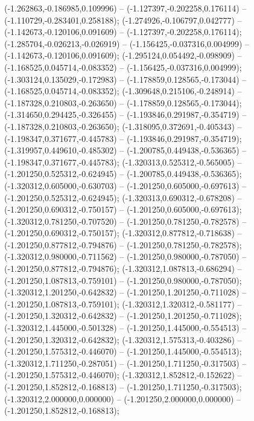  (-1.262863,-0.186985,0.109996) -- (-1.127397,-0.202258,0.176114) -- (-1.110729,-0.283401,0.258188);
 (-1.274926,-0.106797,0.042777) -- (-1.142673,-0.120106,0.091609) -- (-1.127397,-0.202258,0.176114);
 (-1.285704,-0.026213,-0.026919) -- (-1.156425,-0.037316,0.004999) -- (-1.142673,-0.120106,0.091609);
 (-1.295124,0.054492,-0.098909) -- (-1.168525,0.045714,-0.083352) -- (-1.156425,-0.037316,0.004999);
 (-1.303124,0.135029,-0.172983) -- (-1.178859,0.128565,-0.173044) -- (-1.168525,0.045714,-0.083352);
 (-1.309648,0.215106,-0.248914) -- (-1.187328,0.210803,-0.263650) -- (-1.178859,0.128565,-0.173044);
 (-1.314650,0.294425,-0.326455) -- (-1.193846,0.291987,-0.354719) -- (-1.187328,0.210803,-0.263650);
 (-1.318095,0.372691,-0.405343) -- (-1.198347,0.371677,-0.445783) -- (-1.193846,0.291987,-0.354719);
 (-1.319957,0.449610,-0.485302) -- (-1.200785,0.449438,-0.536365) -- (-1.198347,0.371677,-0.445783);
 (-1.320313,0.525312,-0.565005) -- (-1.201250,0.525312,-0.624945) -- (-1.200785,0.449438,-0.536365);
 (-1.320312,0.605000,-0.630703) -- (-1.201250,0.605000,-0.697613) -- (-1.201250,0.525312,-0.624945);
 (-1.320313,0.690312,-0.678208) -- (-1.201250,0.690312,-0.750157) -- (-1.201250,0.605000,-0.697613);
 (-1.320312,0.781250,-0.707520) -- (-1.201250,0.781250,-0.782578) -- (-1.201250,0.690312,-0.750157);
 (-1.320312,0.877812,-0.718638) -- (-1.201250,0.877812,-0.794876) -- (-1.201250,0.781250,-0.782578);
 (-1.320312,0.980000,-0.711562) -- (-1.201250,0.980000,-0.787050) -- (-1.201250,0.877812,-0.794876);
 (-1.320312,1.087813,-0.686294) -- (-1.201250,1.087813,-0.759101) -- (-1.201250,0.980000,-0.787050);
 (-1.320312,1.201250,-0.642832) -- (-1.201250,1.201250,-0.711028) -- (-1.201250,1.087813,-0.759101);
 (-1.320312,1.320312,-0.581177) -- (-1.201250,1.320312,-0.642832) -- (-1.201250,1.201250,-0.711028);
 (-1.320312,1.445000,-0.501328) -- (-1.201250,1.445000,-0.554513) -- (-1.201250,1.320312,-0.642832);
 (-1.320312,1.575313,-0.403286) -- (-1.201250,1.575312,-0.446070) -- (-1.201250,1.445000,-0.554513);
 (-1.320312,1.711250,-0.287051) -- (-1.201250,1.711250,-0.317503) -- (-1.201250,1.575312,-0.446070);
 (-1.320312,1.852812,-0.152622) -- (-1.201250,1.852812,-0.168813) -- (-1.201250,1.711250,-0.317503);
 (-1.320312,2.000000,0.000000) -- (-1.201250,2.000000,0.000000) -- (-1.201250,1.852812,-0.168813);
